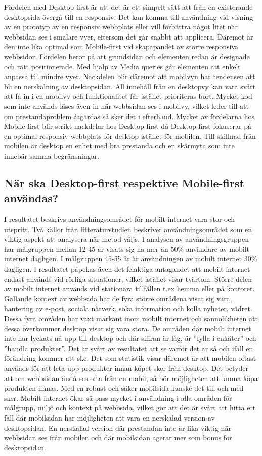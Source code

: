 \documentclass[11pt]{article}
\begin{document}
Fördelen med Desktop-first är att det är ett simpelt sätt att från en existerande desktopsida övergå till en responsiv. Det kan komma till användning vid visning av en prototyp av en responsiv webbplats eller vill förbättra något litet när webbsidan ses i smalare vyer, eftersom det går snabbt att applicera. Däremot är den inte lika optimal som Mobile-first vid skapapandet av större responsiva webbsidor. Fördelen beror på att grundsidan och elementen redan är designade och rätt positionerade. Med hjälp av Media queries går elementen att enkelt anpassa till mindre vyer. Nackdelen blir däremot att mobilvyn har tendensen att bli en nerskalning av desktopsidan. All innehåll från en desktopvy kan vara svårt att få in i en mobilvy och funktionalitet får istället prioriteras bort. Mycket kod som inte används läses även in när webbsidan ses i mobilvy, vilket leder till att om prestandaproblem åtgärdas så sker det i efterhand. Mycket av fördelarna hos Mobile-first blir strikt nackdelar hos Desktop-first då Desktop-first fokuserar på en optimal responsiv webbplats för desktop istället för mobilen. Till skillnad från mobilen är desktop en enhet med bra prestanda och en skärmyta som inte innebär samma begränsningar.

\subsection{När ska Desktop-first respektive Mobile-first användas?}
I resultatet beskrivs användningsområdet för mobilt internet vara stor och utspritt. Två källor från litteraturstudien beskriver användningsområdet som en viktig aspekt att analysera när metod väljs. I analysen av användningsgruppen har målgruppen mellan 12-45 år visats sig ha mer än 50\% användare av mobilt internet dagligen. I målgruppen 45-55 år är användningen av mobilt internet 30\% dagligen. I resultatet påpekas även det felaktiga antagandet att mobilt internet endast används vid rörliga situationer, vilket istället visar tvärtom. Större delen av mobilt internet används vid stationära tillfällen t.ex hemma eller på kontoret. Gällande kontext av webbsida har de fyra större områdena visat sig vara, hantering av e-post, sociala nätverk, söka information och kolla nyheter, vädret.  Dessa fyra områden har växt markant inom mobilt internet och sannolikheten att dessa överkommer desktop visar sig vara stora. De områden där mobilt internet inte har lyckats nå upp till desktop och där siffran är låg, är ”fylla i enkäter” och ”handla produkter”. Det är svårt av resultatet att se varför det är så och ifall en förändring kommer att ske. Det som statistik visar däremot är att mobilen oftast används för att leta upp produkter innan köpet sker från desktop. Det betyder att om webbsidan ändå ses ofta från en mobil, så bör möjligheten att kunna köpa produkten finnas. Med en robust och säker mobilsida kanske det till och med sker. Mobilt internet ökar så pass mycket i användning i alla områden för målgrupp,  miljö och kontext på webbsida, vilket gör att det är svårt att hitta ett fall där mobilsidan har möjligheten att vara en nerskalad version av desktopsidan. En nerskalad version där prestandan inte är lika viktig när webbsidan ses från mobilen och där mobilsidan agerar mer som bonus för desktopsidan.
\end{document}
